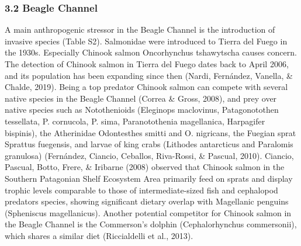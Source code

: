 \documentclass[
]{article}
\begin{document}
\subsubsection{3.2 Beagle Channel}\label{beagle-channel}

A main anthropogenic stressor in the Beagle Channel is the introduction
of invasive species (Table S2). Salmonidae were introduced to Tierra del
Fuego in the 1930s. Especially Chinook salmon Oncorhynchus tshawytscha
causes concern. The detection of Chinook salmon in Tierra del Fuego
dates back to April 2006, and its population has been expanding since
then (Nardi, Fernández, Vanella, \& Chalde, 2019). Being a top predator
Chinook salmon can compete with several native species in the Beagle
Channel (Correa \& Gross, 2008), and prey over native species such as
Notothenioids (Eleginops maclovinus, Patagonotothen tessellata, P.
cornucola, P. sima, Paranotothenia magellanica, Harpagifer bispinis),
the Atherinidae Odontesthes smitti and O. nigricans, the Fuegian sprat
Sprattus fuegensis, and larvae of king crabs (Lithodes antarcticus and
Paralomis granulosa) (Fernández, Ciancio, Ceballos, Riva-Rossi, \&
Pascual, 2010). Ciancio, Pascual, Botto, Frere, \& Iribarne (2008)
observed that Chinook salmon in the Southern Patagonian Shelf Ecosystem
Area primarily feed on sprats and display trophic levels comparable to
those of intermediate-sized fish and cephalopod predators species,
showing significant dietary overlap with Magellanic penguins (Spheniscus
magellanicus). Another potential competitor for Chinook salmon in the
Beagle Channel is the Commerson's dolphin (Cephalorhynchus commersonii),
which shares a similar diet (Riccialdelli et al., 2013).
\end{document}
